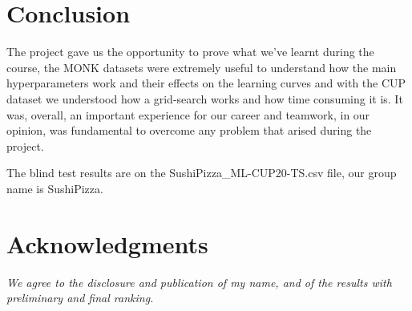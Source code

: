 \section{Conclusion}
The project gave us the opportunity to prove what we've learnt during the course, the MONK datasets were extremely useful to understand how the main hyperparameters work and their effects on the learning curves and with the CUP dataset we understood how a grid-search works and how time consuming it is. It was, overall, an important experience for our career and teamwork, in our opinion, was fundamental to overcome any problem that arised during the project.
\vspace{3mm}

The blind test results are on the SushiPizza\_ML-CUP20-TS.csv file, our group name is SushiPizza.

\section*{Acknowledgments}
\noindent\textit{We agree to the disclosure and publication of my name, and of the results with preliminary and final ranking.}
